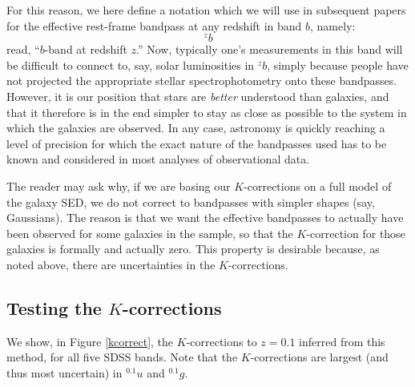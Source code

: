 \documentclass[10pt,preprint]{aastex}
\newcommand{\band}[2]{\ensuremath{^{#1}{#2}}}
\begin{document}
For this reason, we here define a notation which we will use in
subsequent papers for the effective rest-frame bandpass at any
redshift in band $b$, namely:
\begin{equation}
\band{z}{b}
\end{equation}
read, ``$b$-band at redshift $z$.'' Now, typically one's measurements
in this band will be difficult to connect to, say, solar luminosities
in $\band{z}{b}$, simply because people have not projected the appropriate
stellar spectrophotometry onto these bandpasses. However, it is our
position that stars are {\it better} understood than galaxies, and
that it therefore is in the end simpler to stay as close as possible
to the system in which the galaxies are observed. In any case,
astronomy is quickly reaching a level of precision for which the exact
nature of the bandpasses used has to be known and considered in most
analyses of observational data.

The reader may ask why, if we are basing our $K$-corrections on a full
model of the galaxy SED, we do not correct to bandpasses with simpler
shapes (say, Gaussians). The reason is that we want the effective
bandpasses to actually have been observed for some galaxies in the
sample, so that the $K$-correction for those galaxies is formally and
actually zero. This property is desirable because, as noted above,
there are uncertainties in the $K$-corrections.

\subsection{Testing the $K$-corrections}

We show, in Figure \ref{kcorrect}, the $K$-corrections to $z=0.1$
inferred from this method, for all five SDSS bands. Note that the
$K$-corrections are largest (and thus most uncertain) in
$\band{0.1}{u}$ and $\band{0.1}{g}$. 
\end{document}
